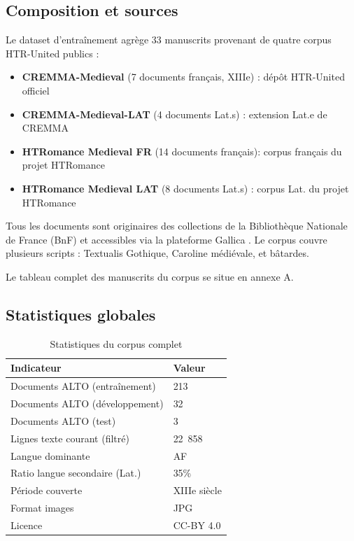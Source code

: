 ﻿\documentclass[twoside,twocolumn,10pt]{article}
\begin{document}
\subsection{Composition et sources}

Le dataset d'entraînement agrège 33 manuscrits provenant de quatre corpus HTR-United publics :

\begin{itemize}
  \item \textbf{CREMMA-Medieval} (7 documents français, XIIIe) : dépôt HTR-United officiel
  \item \textbf{CREMMA-Medieval-LAT} (4 documents Lat.s) : extension Lat.e de CREMMA \cite{cremma_medieval_lat2023}
  \item \textbf{HTRomance Medieval FR} (14 documents français): corpus français du projet HTRomance
  \item \textbf{HTRomance Medieval LAT} (8 documents Lat.s) : corpus Lat. du projet HTRomance \cite{htromance_medieval2023}
\end{itemize}

Tous les documents sont originaires des collections de la Bibliothèque Nationale de France (BnF) et accessibles via la plateforme Gallica \cite{gallica2023}. Le corpus couvre plusieurs scripts : Textualis Gothique, Caroline médiévale, et bâtardes.

Le tableau complet des manuscrits du corpus se situe en annexe A.

\subsection{Statistiques globales}

\begin{table}[!htbp]
\fontsize{10}{11}\selectfont
\centering
\caption{Statistiques du corpus complet}
\begin{tabular}{L{5.1cm}|C{1.9cm}}
\toprule
Indicateur & Valeur \\
\midrule
Documents ALTO (entraînement) & 213 \\
Documents ALTO (développement) & 32 \\
Documents ALTO (test) & 3 \\
Lignes texte courant (filtré) & 22~858 \\
Langue dominante & AF \\
Ratio langue secondaire (Lat.) & 35\% \\
Période couverte & XIIIe siècle \\
Format images & JPG \\
Licence & CC-BY 4.0 \\
\bottomrule
\end{tabular}
\end{table}
\end{document}
